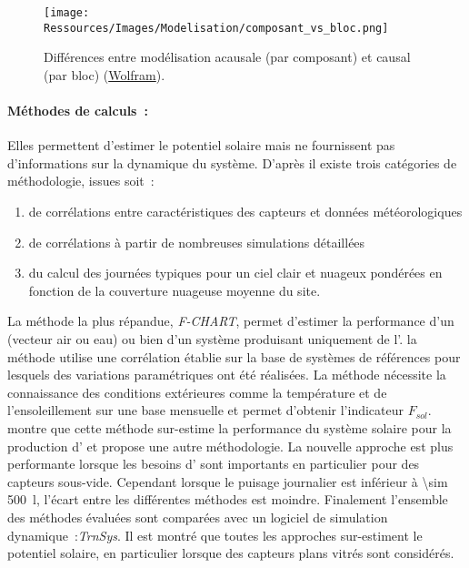 \begin{figure}
    \centering
    \texttt{[image: Ressources/Images/Modelisation/composant\_vs\_bloc.png]}
    \caption[Différences entre modélisation acausale et causal]
            {Différences entre modélisation acausale (par composant) et causal (par bloc)
             (\href{http://www.wolfram.com/system-modeler/}{Wolfram}).}
    \label{fig:acausal_vs_causal}
\end{figure}

\paragraph{Méthodes de calculs~:} %
\label{par:methodes_de_calculs}
Elles permettent d’estimer le potentiel solaire mais ne fournissent pas d’informations sur
la dynamique du système. D’après \textcite{Duffie1980} il existe trois catégories de
méthodologie, issues soit~:
\begin{enumerate}
    \item de corrélations entre caractéristiques des capteurs et
          données météorologiques
    \item de corrélations à partir de nombreuses simulations détaillées
    \item du calcul des journées typiques pour un ciel clair et nuageux
          pondérées en fonction de la couverture nuageuse moyenne du site.
\end{enumerate}
La méthode la plus répandue, \textit{F-CHART}, permet d’estimer la performance
d’un  (vecteur air ou eau) ou bien d’un système produisant uniquement de
l’. la méthode utilise une corrélation établie sur la base de systèmes de
références pour lesquels des variations paramétriques ont été réalisées. La méthode
nécessite la connaissance des conditions extérieures comme la température et de l’ensoleillement
sur une base mensuelle et permet d’obtenir l’indicateur $F_{sol}$. \textcite{Cuadros200796} montre que cette
méthode sur-estime la performance du système solaire pour la production d’ et
propose une autre méthodologie. La nouvelle approche est plus performante lorsque les
besoins d’ sont importants en particulier pour des capteurs sous-vide. Cependant
lorsque le puisage journalier est inférieur à \SI{\sim 500}{\litre}, l’écart entre les
différentes méthodes est moindre. Finalement l’ensemble des méthodes évaluées sont
comparées avec un logiciel de simulation dynamique~:\textit{TrnSys}. Il est montré que
toutes les approches sur-estiment le potentiel solaire, en particulier lorsque des
capteurs plans vitrés sont considérés.


